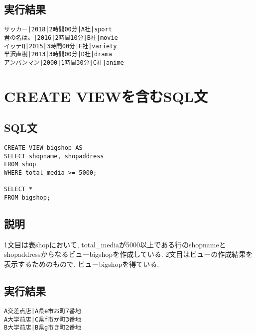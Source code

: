 \documentclass{jarticle}
\begin{document}
\subsection{実行結果}
\begin{verbatim}
サッカー|2018|2時間00分|A社|sport
君の名は。|2016|2時間10分|B社|movie
イッテQ|2015|3時間00分|E社|variety
半沢直樹|2013|3時間00分|D社|drama
アンパンマン|2000|1時間30分|C社|anime
\end{verbatim}
\section{CREATE VIEWを含むSQL文}
\subsection{SQL文}
\begin{verbatim}
CREATE VIEW bigshop AS 
SELECT shopname, shopaddress 
FROM shop 
WHERE total_media >= 5000;

SELECT * 
FROM bigshop;
\end{verbatim}
\subsection{説明}
1文目は表shopにおいて, total\_mediaが5000以上である行のshopnameとshopaddressからなるビューbigshopを作成している.
2文目はビューの作成結果を表示するためのもので, ビューbigshopを得ている.
\subsection{実行結果}
\begin{verbatim}
A交差点店|A県e市お町7番地
A大学前店|C県f市か町3番地
B大学前店|B県g市き町2番地
\end{verbatim}
\end{document}

